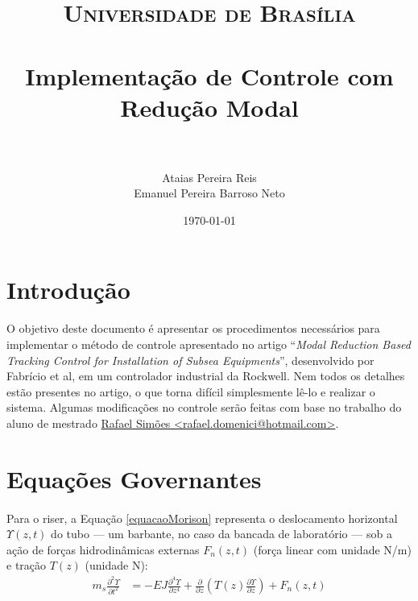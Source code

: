 \documentclass[a4paper,11pt]{scrartcl} %
\title{
\normalfont \normalsize
\textsc{Universidade de Brasília} \\ [25pt] %
\horrule{0.5pt} \\[0.4cm] %
\huge Implementação de Controle com Redução Modal \\ %
\horrule{2pt} \\[0.5cm] %
}
\author{Ataias Pereira Reis \\ Emanuel Pereira Barroso Neto} %
\date{\normalsize\today} %
\numberwithin{equation}{section} %
\numberwithin{figure}{section} %
\numberwithin{table}{section} %
\begin{document}
\maketitle %


\section{Introdução}
\paragraph{} O objetivo deste documento é apresentar os procedimentos necessários para implementar o método de controle apresentado no artigo ``\textit{Modal Reduction Based Tracking Control for Installation of Subsea Equipments}'', desenvolvido por Fabrício et al, em um controlador industrial da Rockwell. Nem todos os detalhes estão presentes no artigo, o que torna difícil simplesmente lê-lo e realizar o sistema. Algumas modificações no controle serão feitas com base no trabalho do aluno de mestrado  \href{mailto:rafael.domenici@hotmail.com}{Rafael Simões <rafael.domenici@hotmail.com>}.

\section{Equações Governantes}
\paragraph{} Para o riser, a Equação \ref{equacaoMorison} representa o deslocamento horizontal $\Upsilon(z,t)$ do tubo --- um barbante, no caso da bancada de laboratório --- sob a ação de forças hidrodinâmicas externas $F_n(z,t)$ (força linear com unidade N/m) e tração $T(z)$ (unidade N): \begin{align}
	m_s \frac{\partial^2 \Upsilon}{\partial t^2} &= -EJ \frac{\partial^4 \Upsilon}{\partial z^4} + 	\frac{\partial}{\partial z}\left(T(z)\frac{\partial \Upsilon}{\partial z}\right)+F_n(z,t) \label{equacaoMorison}
\end{align}
\end{document}
